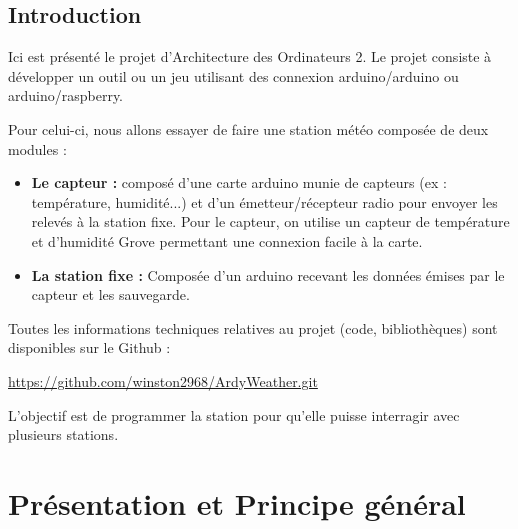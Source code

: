 \documentclass[a4paper]{article}
\begin{document}



\tableofcontents


\justify

\newpage 

\subsection*{Introduction}

Ici est présenté le projet d'Architecture des Ordinateurs 2. Le projet consiste à développer un outil ou un jeu 
utilisant des connexion arduino/arduino ou arduino/raspberry. 

Pour celui-ci, nous allons essayer de faire une station météo composée de deux modules : 
\begin{itemize}
    \item \textbf{Le capteur : } composé d'une carte arduino munie de capteurs (ex : température, humidité...) et d'un émetteur/récepteur 
    radio pour envoyer les relevés à la station fixe. 
    Pour le capteur, on utilise un {capteur de température et d'humidité Grove} permettant 
    une connexion facile à la carte. 
    \item \textbf{La station fixe : } Composée d'un arduino recevant les données émises par le capteur et les 
    sauvegarde. 
\end{itemize}

Toutes les informations techniques relatives au projet (code, bibliothèques) sont disponibles sur le Github : 
\begin{center}
    \href{https://github.com/winston2968/ArdyWeather.git}{https://github.com/winston2968/ArdyWeather.git}
\end{center}

L'objectif est de programmer la station pour qu'elle puisse interragir avec plusieurs 
stations. 
 


\section{Présentation et Principe général}
\end{document}
